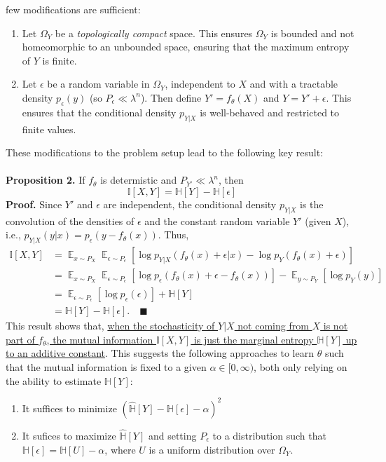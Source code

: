 \documentclass{NSF}
\newcommand{\E} {
    \mathop{\mathbb{E}}
}
\begin{document}
few modifications are sufficient:
\begin{enumerate}
\item Let $\Omega_Y$ be a \textit{topologically compact} space. This ensures $\Omega_Y$
is bounded and not homeomorphic to an unbounded space, ensuring that the maximum entropy
of $Y$ is finite.
\item Let $\epsilon$ be a random variable in $\Omega_Y$, independent to $X$ and with a
tractable density $p_\epsilon(y)$ (so $P_\epsilon \ll \lambda^n$). Then define
$Y' = f_\theta(X)$ and $Y = Y' + \epsilon$. This ensures that the conditional density
$p_{Y|X}$ is well-behaved and restricted to finite values.
\end{enumerate}
These modifications to the problem setup lead to the following key result:
\\
\\
\textbf{Proposition 2.} If $f_\theta$ is determistic and $P_{Y'} \ll \lambda^n$, then
\[
    \mathbb{I}[X,Y]
    = \mathbb{H}[Y] - \mathbb{H}[\epsilon]
\]
\textbf{Proof.} Since $Y'$ and $\epsilon$ are independent, the conditional density
$p_{Y|X}$ is the convolution of the densities of $\epsilon$ and the constant random
variable $Y'$ (given $X$), i.e., $p_{Y|X}(y|x) = p_\epsilon(y - f_\theta(x))$. Thus,
\begin{align*}
    \mathbb{I}[X,Y]
    &= \E_{x\sim P_X} \E_{\epsilon \sim P_\epsilon} \left[
       \log p_{Y|X}(f_\theta(x) + \epsilon|x) - \log p_Y(f_\theta(x) + \epsilon) \right]
    \\
    &= \E_{x\sim P_X} \E_{\epsilon \sim P_\epsilon}
       \left[ \log p_\epsilon(f_\theta(x) + \epsilon - f_\theta(x)) \right]
       - \E_{y\sim P_Y} \left[ \log p_Y(y) \right]
    \\
    &= \E_{\epsilon \sim P_\epsilon} \left[ \log p_\epsilon(\epsilon) \right]
       + \mathbb{H}[Y]
    \\
    &= \mathbb{H}[Y] - \mathbb{H}[\epsilon].
    \quad\blacksquare
\end{align*}
This result shows that, \ul{when the stochasticity of $Y|X$ not coming from $X$
is not part of $f_\theta$, the mutual information $\mathbb{I}[X,Y]$ is just the marginal
entropy $\mathbb{H}[Y]$ up to an additive constant}. This suggests the following
approaches to learn $\theta$ such that the mutual information is fixed to a given
$\alpha \in [0,\infty)$, both only relying on the ability to estimate $\mathbb{H}[Y]$:
\begin{enumerate}
\item It suffices to minimize
$\left(\hat{\mathbb{H}}[Y] - \mathbb{H}[\epsilon] - \alpha\right)^2$
\item It sufices to maximize $\hat{\mathbb{H}}[Y]$ and setting $P_\epsilon$ to a
distribution such that $\mathbb{H}[\epsilon] = \mathbb{H}[U] - \alpha$, where $U$ is a
uniform distribution over $\Omega_Y$.
\end{enumerate}
\end{document}
